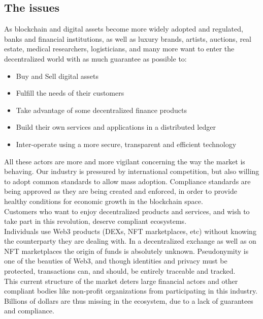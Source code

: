 ﻿\documentclass[a4paper]{article}
\begin{document}
\subsection{The issues}
As blockchain and digital assets become more widely adopted and regulated, banks and financial institutions, as well as luxury brands, artists, auctions, real estate, medical researchers, logisticians, and many more want to enter the decentralized world with as much guarantee as possible to:

\begin{itemize}
\item Buy and Sell digital assets
\item Fulfill the needs of their customers
\item Take advantage of some decentralized finance products
\item Build their own services and applications in a distributed ledger
\item Inter-operate using a more secure, transparent and efficient technology
\end{itemize}

All these actors are more and more vigilant concerning the way the market is behaving. Our industry is pressured by international competition, but also willing to adopt common standards to allow mass adoption. Compliance standards are being approved as they are being created and enforced, in order to provide healthy conditions for economic growth in the blockchain space. \\

Customers who want to enjoy decentralized products and services, and wish to take part in this revolution, deserve compliant ecosystems. \\

Individuals use Web3 products (DEXs, NFT marketplaces, etc) without knowing the counterparty they are dealing with. In a decentralized exchange as well as on NFT marketplaces the origin of funds is absolutely unknown. Pseudonymity is one of the beauties of Web3, and though identities and privacy must be protected, transactions can, and should, be entirely traceable and tracked. \\

This current structure of the market deters large financial actors and other compliant bodies like non-profit organizations from participating in this industry. Billions of dollars are thus missing in the ecosystem, due to a lack of guarantees and compliance. \\
\end{document}
